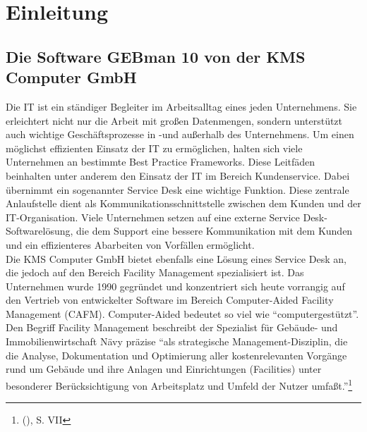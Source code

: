 \section{Einleitung}


\subsection{Die Software GEBman 10 von der KMS Computer GmbH}
\noindent
Die IT ist ein ständiger Begleiter im Arbeitsalltag eines jeden Unternehmens. Sie erleichtert nicht nur die Arbeit mit großen Datenmengen, sondern unterstützt auch wichtige Geschäftsprozesse in -und außerhalb des Unternehmens. Um einen möglichst effizienten Einsatz der IT zu ermöglichen, halten sich viele Unternehmen an bestimmte Best Practice Frameworks. Diese Leitfäden beinhalten unter anderem den Einsatz der IT im Bereich Kundenservice. Dabei übernimmt ein sogenannter Service Desk eine wichtige Funktion. Diese zentrale Anlaufstelle dient als Kommunikationsschnittstelle zwischen dem Kunden und der IT-Organisation. Viele Unternehmen setzen auf eine externe Service Desk-Softwarelösung, die dem Support eine bessere Kommunikation mit dem Kunden und ein effizienteres Abarbeiten von Vorfällen ermöglicht.\\

\noindent
Die KMS Computer GmbH bietet ebenfalls eine Lösung eines Service Desk an, die jedoch auf den Bereich Facility Management spezialisiert ist. Das Unternehmen wurde 1990 gegründet und konzentriert sich heute vorrangig auf den Vertrieb von entwickelter Software im Bereich Computer-Aided Facility Management (CAFM). Computer-Aided bedeutet so viel wie \enquote{computergestützt}. Den Begriff Facility Management beschreibt der Spezialist für Gebäude- und Immobilienwirtschaft Nävy präzise \enquote{als strategische Management-Disziplin, die die Analyse, Dokumentation und Optimierung aller kostenrelevanten Vorgänge rund um Gebäude und ihre Anlagen und Einrichtungen (Facilities) unter besonderer Berücksichtigung von Arbeitsplatz und Umfeld der Nutzer umfaßt.}\footnote{\citeauthor{Naevy} (\citeyear{Naevy}), S. VII}\\

